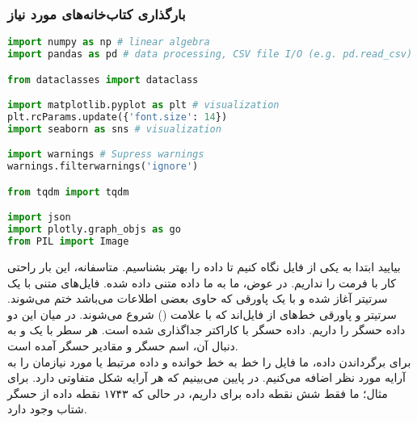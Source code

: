 \documentclass{article}
\begin{document}
\subsubsection*{بارگذاری کتاب‌خانه‌های مورد نیاز}
\begin{latin}
\begin{lstlisting}[language=Python]
import numpy as np # linear algebra
import pandas as pd # data processing, CSV file I/O (e.g. pd.read_csv)

from dataclasses import dataclass

import matplotlib.pyplot as plt # visualization
plt.rcParams.update({'font.size': 14})
import seaborn as sns # visualization

import warnings # Supress warnings 
warnings.filterwarnings('ignore')

from tqdm import tqdm

import json
import plotly.graph_objs as go
from PIL import Image
\end{lstlisting}
\end{latin}
بیایید ابتدا به یکی از فایل‌ نگاه کنیم تا داده را بهتر بشناسیم. متاسفانه، این بار راحتی کار با فرمت  را نداریم. در عوض، ما به ما داده‌ متنی داده شده. فایل‌های متنی با یک سرتیتر آغاز شده و با یک پاورقی که حاوی بعضی اطلاعات می‌باشد ختم می‌شوند. سرتیتر و پاورقی خط‌های از فایل‌اند که با علامت (\lr{\#}) شروع می‌شوند. در میان این دو داده حسگر را داریم. داده حسگر با کاراکتر  جداگذاری شده است. هر سطر با یک  و به دنبال آن، اسم حسگر و مقادیر حسگر آمده است. \\
برای برگرداندن داده، ما فایل را خط به خط خوانده و داده مرتبط یا مورد نیازمان را به آرایه مورد نظر اضافه می‌کنیم. در پایین می‌بینیم که هر آرایه شکل متفاوتی دارد. برای مثال؛ ما فقط شش نقطه داده برای  داریم، در حالی که ۱۷۴۳ نقطه داده از حسگر شتاب وجود دارد. 
\end{document}
